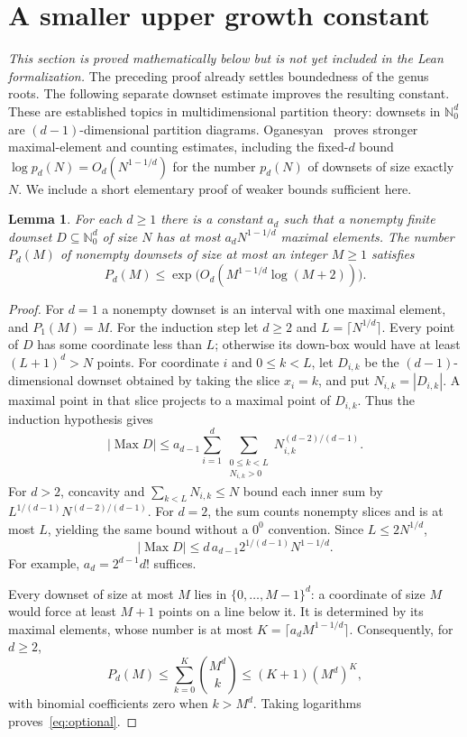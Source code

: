 \documentclass[11pt]{article}
\newtheorem{lemma}[theorem]{Lemma}
\theoremstyle{remark}
\newcommand{\N}{\mathbb N_0}
\DeclareMathOperator{\Max}{Max}
\begin{document}
\section{A smaller upper growth constant}\label{sec:optional}
\textit{This section is proved mathematically below but is not yet included
in the Lean formalization.}
The preceding proof already settles boundedness of the genus roots.
The following separate downset estimate improves the resulting constant.
These are established topics in multidimensional partition theory:
downsets in $\N^d$ are $(d-1)$-dimensional partition diagrams.
Oganesyan~\cite[Lemma~1 and Theorem~1]{Oganesyan} proves stronger
maximal-element and counting estimates, including the fixed-$d$ bound
$\log p_d(N)=O_d(N^{1-1/d})$ for the number $p_d(N)$ of downsets of
size exactly $N$. We include a short elementary proof of weaker bounds
sufficient here.

\begin{lemma}\label{lem:optional}
For each $d\ge1$ there is a constant $a_d$ such that a nonempty finite
downset $D\subseteq\N^d$ of size $N$ has at most $a_dN^{1-1/d}$
maximal elements. The number $P_d(M)$ of nonempty downsets of size at
most an integer $M\ge1$ satisfies
\begin{equation}\label{eq:optional}
 P_d(M)\le\exp\bigl(O_d(M^{1-1/d}\log(M+2))\bigr).
\end{equation}
\end{lemma}
\begin{proof}
For $d=1$ a nonempty downset is an interval with one maximal element,
and $P_1(M)=M$. For the induction step let $d\ge2$ and
$L=\lceil N^{1/d}\rceil$. Every point of $D$ has some coordinate
less than $L$; otherwise its down-box would have at least $(L+1)^d>N$
points. For coordinate $i$ and $0\le k<L$, let $D_{i,k}$ be the
$(d-1)$-dimensional downset obtained by taking the slice $x_i=k$,
and put $N_{i,k}=|D_{i,k}|$. A maximal point in that slice projects
to a maximal point of $D_{i,k}$. Thus the induction hypothesis gives
\[
 |\Max D|\le a_{d-1}\sum_{i=1}^d
 \sum_{\substack{0\le k<L\\N_{i,k}>0}}N_{i,k}^{(d-2)/(d-1)}.
\]
For $d>2$, concavity and $\sum_{k<L}N_{i,k}\le N$ bound each inner
sum by $L^{1/(d-1)}N^{(d-2)/(d-1)}$. For $d=2$, the sum counts
nonempty slices and is at most $L$, yielding the same bound without
a $0^0$ convention. Since $L\le2N^{1/d}$,
\[
 |\Max D|\le d\,a_{d-1}2^{1/(d-1)}N^{1-1/d}.
\]
For example, $a_d=2^{d-1}d!$ suffices.

Every downset of size at most $M$ lies in $\{0,\ldots,M-1\}^d$:
a coordinate of size $M$ would force at least $M+1$ points on a line
below it. It is determined by its maximal elements, whose number is at
most $K=\lceil a_dM^{1-1/d}\rceil$. Consequently, for $d\ge2$,
\[
 P_d(M)\le\sum_{k=0}^K\binom{M^d}{k}\le(K+1)(M^d)^K,
\]
with binomial coefficients zero when $k>M^d$. Taking logarithms
proves~\eqref{eq:optional}.
\end{proof}
\end{document}
